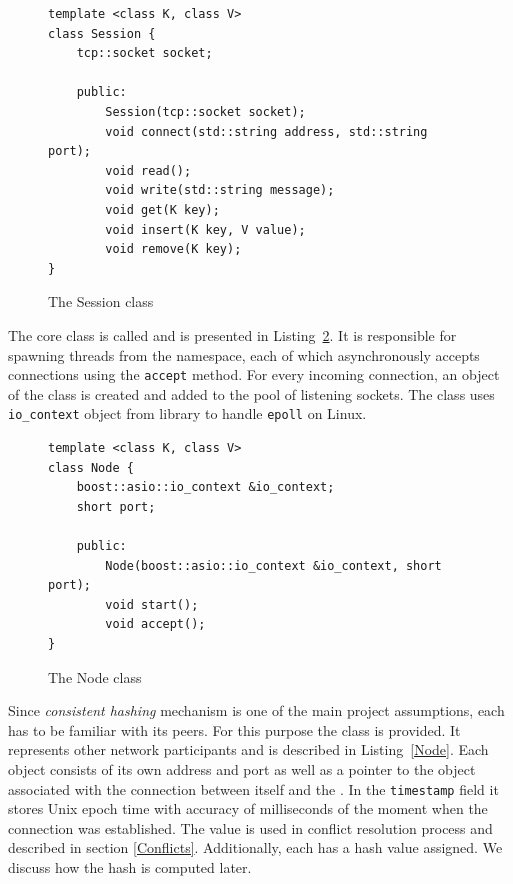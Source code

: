 \begin{figure}[ht] 
\renewcommand{\figurename}{Listing}
    \begin{lstlisting}
template <class K, class V>
class Session {
    tcp::socket socket;
    
    public:
        Session(tcp::socket socket);
        void connect(std::string address, std::string port);
        void read();
        void write(std::string message);
        void get(K key);
        void insert(K key, V value);
        void remove(K key);
}
\end{lstlisting}
\caption{The Session class}
\label{SessionListing}
\end{figure}

The core class is called \Node and is presented in Listing~\ref{NodeListing}. 
It is responsible for spawning threads from the \std namespace, each of which asynchronously accepts connections using the \texttt{accept} method.
For every incoming connection, an object of the \Session class is created and added to the pool of listening sockets.
The class uses \texttt{io\_context} object from \Asio library to handle \texttt{epoll} on Linux.

\begin{figure}[ht] 
\renewcommand{\figurename}{Listing}
\begin{lstlisting}
template <class K, class V>
class Node {
    boost::asio::io_context &io_context;
    short port;
    
    public:
        Node(boost::asio::io_context &io_context, short port);
        void start();
        void accept();
}
    \end{lstlisting}
\caption{The Node class}
\label{NodeListing}
\end{figure}
        
Since \textit{consistent hashing} mechanism is one of the main project assumptions, each \Node has to be familiar with its peers.
For this purpose the \KnownNode class is provided. 
It represents other network participants and is described in Listing~\ref{Node}.
Each \KnownNode object consists of its own address and port as well as a pointer to the \Session object associated with the connection between itself and the \Node.
In the \texttt{timestamp} field it stores Unix epoch time with accuracy of milliseconds of the moment when the connection was established. 
The value is used in conflict resolution process and described in section \ref{Conflicts}.
Additionally, each \KnownNode has a hash value assigned. We discuss how the hash is computed later.

